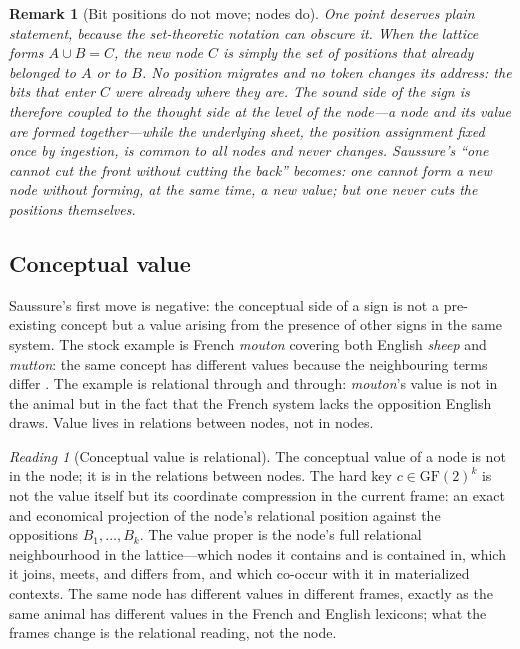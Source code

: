 \documentclass[11pt,a4paper]{article}
\newtheorem{remark}[principle]{Remark}
\theoremstyle{remark}
\newtheorem{reading}[principle]{Reading}
\begin{document}
\begin{remark}[Bit positions do not move; nodes do]
\label{rem:bit-agnostic}
One point deserves plain statement, because the set-theoretic notation can
obscure it. When the lattice forms $A \cup B = C$, the new node $C$ is
simply the set of positions that already belonged to $A$ or to $B$. No
position migrates and no token changes its address: the bits that enter
$C$ were already where they are. The sound side of the sign is therefore
coupled to the thought side at the level of the \emph{node}---a node and
its value are formed together---while the underlying sheet, the position
assignment fixed once by ingestion, is common to all nodes and never
changes. Saussure's ``one cannot cut the front without cutting the back''
becomes: one cannot form a new node without forming, at the same time, a
new value; but one never cuts the positions themselves.
\end{remark}

\subsection{Conceptual value}
\label{sec:conceptual-value}

Saussure's first move is negative: the conceptual side of a sign is not a
pre-existing concept but a value arising from the presence of other signs in
the same system. The stock example is French \emph{mouton} covering both
English \emph{sheep} and \emph{mutton}: the same concept has different values
because the neighbouring terms differ \cite[Part II, ch.~IV, \S2]{harris1983}.
The example is relational through and through: \emph{mouton}'s value is not in
the animal but in the fact that the French system lacks the opposition English
draws. Value lives in relations between nodes, not in nodes.

\begin{reading}[Conceptual value is relational]
\label{read:conceptual}
The conceptual value of a node is not in the node; it is in the relations
between nodes. The hard key $c \in \mathrm{GF}(2)^k$ is not the value itself
but its coordinate compression in the current frame: an exact and economical
projection of the node's relational position against the oppositions
$B_1,\dots,B_k$. The value proper is the node's full relational neighbourhood
in the lattice---which nodes it contains and is contained in, which it joins,
meets, and differs from, and which co-occur with it in materialized contexts.
The same node has different values in different frames, exactly as the same
animal has different values in the French and English lexicons; what the
frames change is the relational reading, not the node.
\end{reading}
\end{document}
